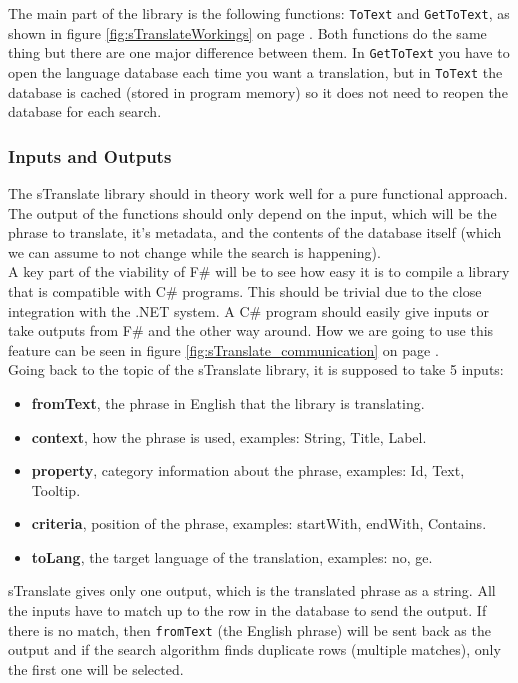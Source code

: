 \documentclass[12pt, a4paper]{article}
\newcommand{\code}[1]{{\small \texttt{#1}}}
\begin{document}
The main part of the library is the following functions: \code{ToText} and \code{GetToText}, as shown in figure \ref{fig:sTranslateWorkings} on page \pageref{fig:sTranslateWorkings}. Both functions do the same thing but there are one major difference between them. In \code{GetToText} you have to open the language database each time you want a translation, but in \code{ToText} the database is cached (stored in program memory) so it does not need to reopen the database for each search.\\

\newpage
\subsubsection{Inputs and Outputs}
The sTranslate library should in theory work well for a pure functional approach. The output of the functions should only depend on the input, which will be the phrase to translate, it's metadata, and the contents of the database itself (which we can assume to not change while the search is happening).\\

A key part of the viability of F\# will be to see how easy it is to compile a library that is compatible with C\# programs. This should be trivial due to the close integration with the .NET system. A C\# program should easily give inputs or take outputs from F\# and the other way around. How we are going to use this feature can be seen in figure \ref{fig:sTranslate_communication} on page \pageref{fig:sTranslate_communication}.\\

Going back to the topic of the sTranslate library, it is supposed to take 5 inputs:

\begin{itemize}
	\item \textbf{fromText}, the phrase in English that the library is translating. 
	\item \textbf{context}, how the phrase is used, examples: String, Title, Label.  
	\item \textbf{property}, category information about the phrase, examples: Id, Text, Tooltip.  
	\item \textbf{criteria}, position of the phrase, examples: startWith, endWith, Contains.
	\item \textbf{toLang}, the target language of the translation, examples: no, ge.
\end{itemize}

sTranslate gives only one output, which is the translated phrase as a string. All the inputs have to match up to the row in the database to send the output. If there is no match, then \code{fromText} (the English phrase) will be sent back as the output and if the search algorithm finds duplicate rows (multiple matches), only the first one will be selected.\\
\end{document}
